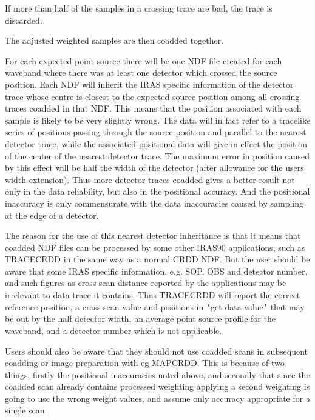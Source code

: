 \documentclass[11pt,nolof,noabs]{starlink}
\begin{document}
\begin{small}
{{      If more than half of the samples in a crossing trace are bad, the trace
      is discarded.

      The adjusted weighted samples are then coadded together.

      For each expected point source there will be one NDF file created
      for each waveband where there was at least one detector which crossed
      the source position. Each NDF will inherit the IRAS specific information
      of the detector trace whose centre is closest to the expected source
      position among all crossing traces coadded in that NDF. This means
      that the position associated with each sample is likely to be very
      slightly wrong. The data will in fact refer to a tracelike series of
      positions passing through the source position and parallel to the
      nearest detector trace, while the associated positional data will give
      in effect the position of the center of the nearest detector trace. The
      maximum error in position caused by this effect will be half the width
      of the detector (after allowance for the users width extension).
      Thus more detector traces coadded gives a better result not only in
      the data reliability, but also in the positional accuracy. And the
      positional inaccuracy is only commensurate with the data inaccuracies
      caused by sampling at the edge of a detector.

      The reason for the use of this nearest detector inheritance is that
      it means that coadded NDF files can be processed by some other IRAS90
      applications, such as TRACECRDD in the same way as a normal CRDD NDF.
      But the user should be aware that some IRAS specific information, e.g.
      SOP, OBS and detector number, and such figures as cross scan distance
      reported by the applications may be irrelevant to data trace it contains.
      Thus TRACECRDD will report the correct reference position, a cross scan
      value and positions in \texttt{'}get data value\texttt{'} that may be out by the half
      detector width, an average point source profile for the waveband, and
      a detector number which is not applicable.

      Users should also be aware that they should not use coadded scans in
      subsequent coadding or image preparation with eg MAPCRDD. This is because
      of two things, firstly the positional inaccuracies noted above, and
      secondly that since the coadded scan already contains processed weighting
      applying a second weighting is going to use the wrong weight values, and
      assume only accuracy appropriate for a single scan.

}}
\end{small}
\end{document}
